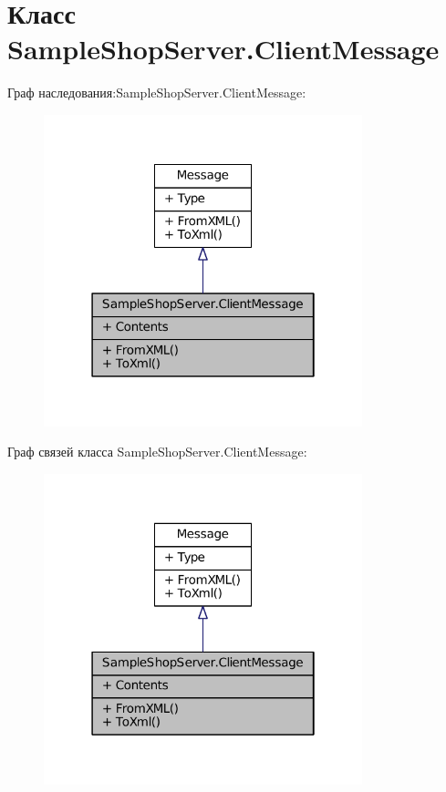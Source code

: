 \hypertarget{class_sample_shop_server_1_1_client_message}{}\section{Класс Sample\+Shop\+Server.\+Client\+Message}
\label{class_sample_shop_server_1_1_client_message}


Граф наследования\+:Sample\+Shop\+Server.\+Client\+Message\+:
\nopagebreak
\begin{figure}[H]
\begin{center}
\leavevmode
\includegraphics[width=262pt]{class_sample_shop_server_1_1_client_message__inherit__graph}
\end{center}
\end{figure}


Граф связей класса Sample\+Shop\+Server.\+Client\+Message\+:
\nopagebreak
\begin{figure}[H]
\begin{center}
\leavevmode
\includegraphics[width=262pt]{class_sample_shop_server_1_1_client_message__coll__graph}
\end{center}
\end{figure}
